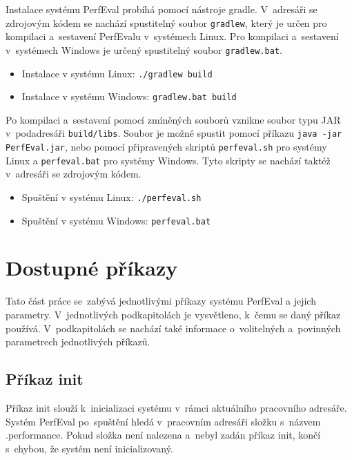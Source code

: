 Instalace systému PerfEval probíhá pomocí nástroje gradle. V~adresáři se zdrojovým kódem se nachází
spustitelný soubor \texttt{gradlew}, který je určen pro kompilaci a~sestavení PerfEvalu v~systémech Linux.
Pro kompilaci a~sestavení v~systémech Windows je určený spustitelný soubor \texttt{gradlew.bat}.

\begin{itemize}
    \item Instalace v systému Linux: \lstinline|./gradlew build|
    \item Instalace v systému Windows: \lstinline|gradlew.bat build|
\end{itemize}

Po kompilaci a~sestavení pomocí zmíněných souborů vznikne soubor typu JAR v~podadresáři \texttt{build/libs}.
Soubor je možné spustit pomocí příkazu \texttt{java -jar PerfEval.jar}, nebo pomocí připravených skriptů
\texttt{perfeval.sh} pro systémy Linux a \texttt{perfeval.bat} pro systémy Windows. Tyto skripty se nachází
taktéž v~adresáři se zdrojovým kódem.

\begin{itemize}
    \item Spuštění v systému Linux: \lstinline|./perfeval.sh|
    \item Spuštění v systému Windows: \lstinline|perfeval.bat|
\end{itemize}

\section{Dostupné příkazy}

Tato část práce se~zabývá jednotlivými příkazy systému PerfEval a jejich parametry.
V~jednotlivých podkapitolách je vysvětleno, k~čemu se daný příkaz používá. V~podkapitolách
se nachází také informace o~volitelných a~povinných parametrech jednotlivých příkazů.

\subsection{Příkaz init}

Příkaz init slouží k~inicializaci systému v~rámci aktuálního pracovního adresáře.
Systém PerfEval po~spuštění hledá v~pracovním adresáři složku s~názvem .performance. Pokud složka
není nalezena a~nebyl zadán příkaz init, končí s~chybou, že systém není inicializovaný.

